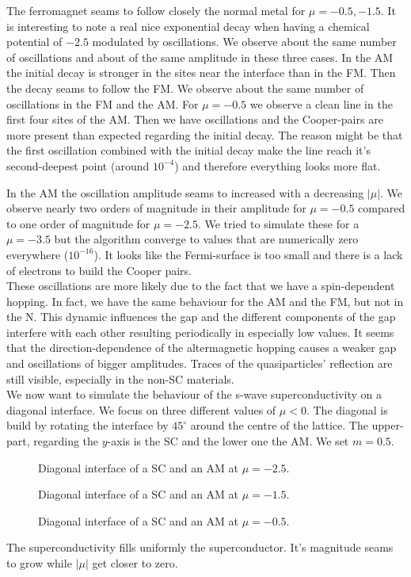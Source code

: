 \documentclass[..\main.tex]{subfile}
\begin{document}
The ferromagnet seams to follow closely the normal metal for $\mu=-0.5,-1.5$. It is interesting to note a real nice exponential
decay when having a chemical potential of $-2.5$ modulated by oscillations. We observe about the same number of oscillations and about of
the same amplitude in these three cases. In the AM the initial decay is stronger in the sites near the 
interface than in the FM. Then the decay seams to follow the FM. We observe about the same number of oscillations in the FM and the AM.
For $\mu=-0.5$ we observe a clean line in the first four sites of the AM. Then we have oscillations and the Cooper-pairs are more present
than expected regarding the initial decay. The reason might be that the first oscillation combined with the initial decay make the line
reach it's second-deepest point (around $10^{-4}$) and therefore everything looks more flat.

In the AM the oscillation amplitude seams to increased with a decreasing $|\mu|$.
We observe nearly two orders of magnitude in their amplitude for $\mu=-0.5$ compared to one order of magnitude for $\mu=-2.5$.
We tried to simulate these for a $\mu=-3.5$ but the algorithm  converge to values that are numerically zero everywhere ($10^{-16}$).
It looks like the Fermi-surface is too small and there is a lack of electrons to build the Cooper pairs.\\
 
These oscillations are more likely due to the fact that we have a spin-dependent hopping. In fact, we have the same behaviour for the AM
and the FM, but not in the N. This dynamic influences the gap and the different components of the gap interfere with each other resulting
periodically in especially low values. It seems that the direction-dependence of the altermagnetic hopping causes a weaker gap and 
oscillations of bigger amplitudes. Traces of the quasiparticles' reflection are still visible, especially in the non-SC materials.\\

We now want to simulate the behaviour of the s-wave superconductivity on a diagonal interface. We focus on three different values of $\mu<0$.  
The diagonal is build by rotating the interface by $45^{\circ}$ around the centre of the lattice. The upper-part, regarding the $y$-axis is the SC
and the lower one the AM. We set $m=0.5$.
\begin{figure}[H]
    \centering
    
    \caption{Diagonal interface of a SC and an AM at $\mu = -2.5$.}
\end{figure}
\begin{figure}[H]
    \centering
    
    \caption{Diagonal interface of a SC and an AM at $\mu = -1.5$.}
\end{figure}
\begin{figure}[H]
    \centering
    
    \caption{Diagonal interface of a SC and an AM at $\mu = -0.5$.}
\end{figure}
The superconductivity fills uniformly the superconductor. It's magnitude seams to grow while $|\mu|$ get closer to zero.
 
\end{document}
